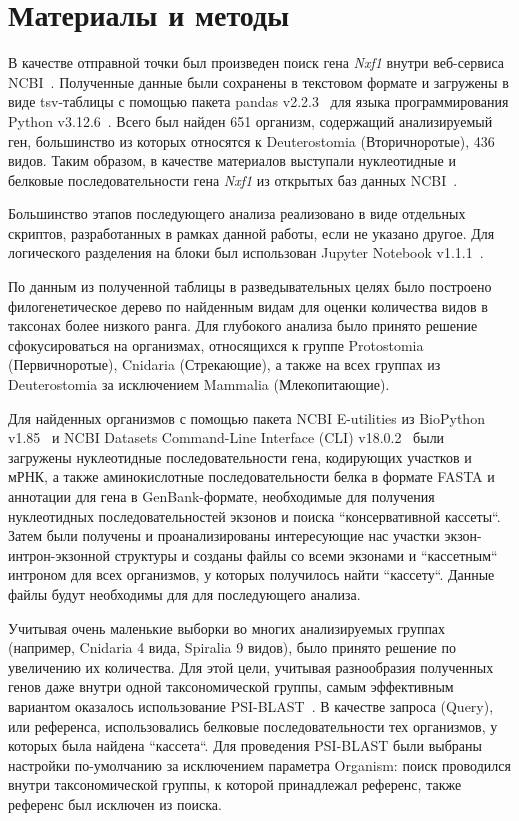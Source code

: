 \newpage
\section{Материалы и методы}

В качестве отправной точки был произведен поиск гена \textit{Nxf1} внутри веб-сервиса NCBI~\cite{ncbi_general}.
Полученные данные были сохранены в текстовом формате и загружены в виде tsv-таблицы с помощью пакета pandas v2.2.3~\cite{pandas} для языка программирования Python v3.12.6~\cite{python_3_12}.
Всего был найден 651 организм, содержащий анализируемый ген, большинство из которых относятся к Deuterostomia (Вторичноротые), 436 видов.
Таким образом, в качестве материалов выступали нуклеотидные и белковые последовательности гена \textit{Nxf1} из открытых баз данных NCBI~\cite{ncbi_general}.

Большинство этапов последующего анализа реализовано в виде отдельных скриптов, разработанных в рамках данной работы, если не указано другое.
Для логического разделения на блоки был использован Jupyter Notebook v1.1.1~\cite{jupyter_notebook}.

По данным из полученной таблицы в разведывательных целях было построено филогенетическое дерево по найденным видам для оценки количества видов в таксонах более низкого ранга.
Для глубокого анализа было принято решение сфокусироваться на организмах, относящихся к группе Protostomia (Первичноротые), Cnidaria (Стрекающие), а также на всех группах из Deuterostomia за исключением Mammalia (Млекопитающие).

Для найденных организмов с помощью пакета NCBI E-utilities из BioPython v1.85~\cite{biopython} и NCBI Datasets Command-Line Interface (CLI) v18.0.2~\cite{datasets} были загружены нуклеотидные последовательности гена, кодирующих участков и мРНК, а также аминокислотные последовательности белка в формате FASTA и аннотации для гена в GenBank-формате, необходимые для получения нуклеотидных последовательностей экзонов и поиска ``консервативной кассеты``.
Затем были получены и проанализированы интересующие нас участки экзон-интрон-экзонной структуры и созданы файлы со всеми экзонами и ``кассетным`` интроном для всех организмов, у которых получилось найти ``кассету``.
Данные файлы будут необходимы для для последующего анализа.

Учитывая очень маленькие выборки во многих анализируемых группах (например, Cnidaria 4 вида, Spiralia 9 видов), было принято решение по увеличению их количества.
Для этой цели, учитывая разнообразия полученных генов даже внутри одной таксономической группы, самым эффективным вариантом оказалось использование PSI-BLAST~\cite{psi_blast}.
В качестве запроса (Query), или референса, использовались белковые последовательности тех организмов, у которых была найдена ``кассета``.
Для проведения PSI-BLAST были выбраны настройки по-умолчанию за исключением параметра Organism: поиск проводился внутри таксономической группы, к которой принадлежал референс, также референс был исключен из поиска.

